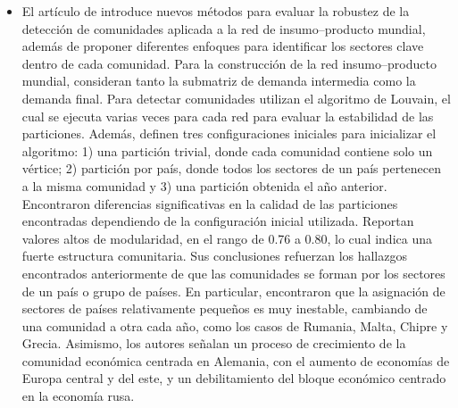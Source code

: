 \begin{itemize}
	\item El artículo de \textcite{Kireyev2022} introduce nuevos métodos para evaluar la robustez de la detección de comunidades aplicada a la red de insumo--producto mundial, además de proponer diferentes enfoques para identificar los sectores clave dentro de cada comunidad. Para la construcción de la red insumo--producto mundial, consideran tanto la submatriz de demanda intermedia como la demanda final. 
	Para detectar comunidades utilizan el algoritmo de Louvain, el cual se ejecuta varias veces para cada red para evaluar la estabilidad de las particiones. Además, definen tres configuraciones iniciales para inicializar el algoritmo: 1) una partición trivial, donde cada comunidad contiene solo un vértice; 2) partición por país, donde todos los sectores de un país pertenecen a la misma comunidad y 3) una partición obtenida el año anterior. Encontraron diferencias significativas en la calidad de las particiones encontradas dependiendo de la configuración inicial utilizada.
	Reportan valores altos de modularidad, en el rango de  0.76 a 0.80, lo cual indica una fuerte estructura comunitaria.
	 Sus conclusiones refuerzan los hallazgos encontrados anteriormente de que las comunidades se forman por los sectores de un país o grupo de países. En particular, encontraron que la asignación de sectores de países relativamente pequeños es muy inestable, cambiando de una comunidad a otra cada año, como los casos de Rumania, Malta, Chipre y Grecia. Asimismo, los autores señalan un proceso de crecimiento de la comunidad económica centrada en Alemania, con el aumento de economías de Europa central y del este, y un debilitamiento del bloque económico centrado en la economía rusa.
\end{itemize}

